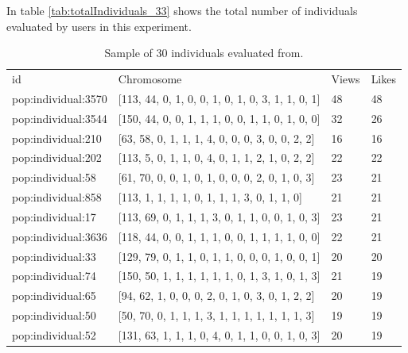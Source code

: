 In table \ref{tab:totalIndividuals_33} shows the total number of individuals
evaluated by users in this experiment.

\begin{table}
\small
\caption{Sample of 30 individuals evaluated from.}
\label{tab:totalIndividuals_32}
\centering
\small
\begin{tabular}{p{3cm} p{4cm} p{3cm} p{3cm}}
\hline\noalign{\smallskip}
 id & Chromosome & Views & Likes  \\
\noalign{\smallskip}\hline\noalign{\smallskip}
\small{pop:individual:3570} & \small{[113, 44, 0, 1, 0, 0, 1, 0, 1, 0, 3, 1, 1, 0, 1]}
& \small{48} & \small{48}\\ \hline
\small{pop:individual:3544} & \small{[150, 44, 0, 0, 1, 1, 1, 0, 0, 1, 1, 0, 1, 0, 0]}
& \small{32} & \small{26}\\ \hline
\small{pop:individual:210} & \small{[63, 58, 0, 1, 1, 1, 4, 0, 0, 0, 3, 0, 0, 2, 2]}
& \small{16} & \small{16}\\ \hline
\small{pop:individual:202} & \small{[113, 5, 0, 1, 1, 0, 4, 0, 1, 1, 2, 1, 0, 2, 2]}
& \small{22} & \small{22}\\ \hline
\small{pop:individual:58} & \small{[61, 70, 0, 0, 1, 0, 1, 0, 0, 0, 2, 0, 1, 0, 3]}
& \small{23} & \small{21}\\ \hline
\small{pop:individual:858} & \small{[113, 1, 1, 1, 1, 0, 1, 1, 1, 3, 0, 1, 1, 0]}
& \small{21} & \small{21}\\ \hline
\small{pop:individual:17} & \small{[113, 69, 0, 1, 1, 1, 3, 0, 1, 1, 0, 0, 1, 0, 3]}
& \small{23} & \small{21}\\ \hline
\small{pop:individual:3636} & \small{[118, 44, 0, 0, 1, 1, 1, 0, 0, 1, 1, 1, 1, 0, 0]}
& \small{22} & \small{21}\\ \hline
\small{pop:individual:33} & \small{[129, 79, 0, 1, 1, 0, 1, 1, 0, 0, 0, 1, 0, 0, 1]}
& \small{20} & \small{20}\\ \hline
\small{pop:individual:74} & \small{[150, 50, 1, 1, 1, 1, 1, 1, 0, 1, 3, 1, 0, 1, 3]}
& \small{21} & \small{19}\\ \hline
\small{pop:individual:65} & \small{[94, 62, 1, 0, 0, 0, 2, 0, 1, 0, 3, 0, 1, 2, 2]}
& \small{20} & \small{19}\\ \hline
\small{pop:individual:50} & \small{[50, 70, 0, 1, 1, 1, 3, 1, 1, 1, 1, 1, 1, 1, 3]}
& \small{19} & \small{19}\\ \hline
\small{pop:individual:52} & \small{[131, 63, 1, 1, 1, 0, 4, 0, 1, 1, 0, 0, 1, 0, 3]}
& \small{20} & \small{19}\\ \hline

\end{tabular}
\end{table}
